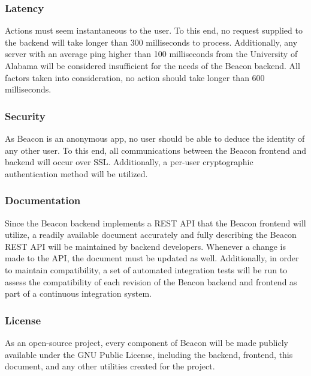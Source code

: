         \subsubsection{Latency}
        Actions must seem instantaneous to the user. To this end, no request supplied
        to the backend will take longer than 300 milliseconds to process. Additionally,
        any server with an average
        ping higher than 100 milliseconds from the University of Alabama will be
        considered insufficient for the needs of the Beacon backend. All factors taken
        into consideration, no action should take longer than 600 milliseconds.

        \subsubsection{Security}
        As Beacon is an anonymous app, no user should be able to deduce the identity of
        any other user. To this end, all communications between the Beacon frontend and
        backend will occur over SSL. Additionally, a per-user cryptographic
        authentication method will be utilized.

        \subsubsection{Documentation}
        Since the Beacon backend implements a REST API that the Beacon frontend will
        utilize, a readily available document accurately and fully describing the
        Beacon REST API will be maintained by backend developers. Whenever a change 
        is made to the API, the document must be updated as well. Additionally, in
        order to maintain compatibility, a set of automated integration tests will be
        run to assess the compatibility of each revision of the Beacon backend and
        frontend as part of a continuous integration system.

        \subsubsection{License}
        As an open-source project, every component of Beacon will be made publicly
        available under the GNU Public License, including the backend, frontend, this
        document, and any other utilities created for the project.
